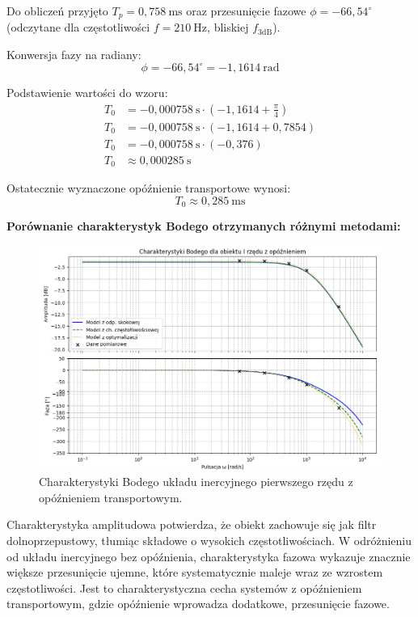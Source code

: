 \documentclass[12pt,a4paper]{article}
\begin{document}
	Do obliczeń przyjęto $T_p = 0{,}758~\text{ms}$ oraz przesunięcie fazowe $\phi = -66{,}54^{\circ}$ (odczytane dla częstotliwości $f = 210~\text{Hz}$, bliskiej $f_{3\text{dB}}$).
	
	Konwersja fazy na radiany:
	\[
	\phi = -66{,}54^{\circ} = -1{,}1614~\text{rad}
	\]
	
	Podstawienie wartości do wzoru:
	\begin{align*}
		T_0 &= -0{,}000758~\text{s} \cdot \left( -1{,}1614 + \frac{\pi}{4} \right) \\
		T_0 &= -0{,}000758~\text{s} \cdot \left( -1{,}1614 + 0{,}7854 \right) \\
		T_0 &= -0{,}000758~\text{s} \cdot (-0{,}376) \\
		T_0 &\approx 0{,}000285~\text{s}
	\end{align*}
	
	Ostatecznie wyznaczone opóźnienie transportowe wynosi:
	\[
	\boxed{T_0 \approx 0{,}285~\text{ms}}
	\]
	
	\textbf{Porównanie charakterystyk Bodego otrzymanych różnymi metodami:}
	\begin{figure}[H]
		\centering
		\includegraphics[width=1\linewidth]{zdjecia/1rzad_z_opz.png}
		\caption{Charakterystyki Bodego układu inercyjnego pierwszego rzędu z opóźnieniem transportowym.}
		\label{fig:Body1_z_opz}
	\end{figure}
	
	Charakterystyka amplitudowa potwierdza, że obiekt zachowuje się jak filtr dolnoprzepustowy, tłumiąc składowe o wysokich częstotliwościach. W odróżnieniu od układu inercyjnego bez opóźnienia, charakterystyka fazowa wykazuje znacznie większe przesunięcie ujemne, które systematycznie maleje wraz ze wzrostem częstotliwości. Jest to charakterystyczna cecha systemów z opóźnieniem transportowym, gdzie opóźnienie wprowadza dodatkowe, przesunięcie fazowe.
	
\end{document}
